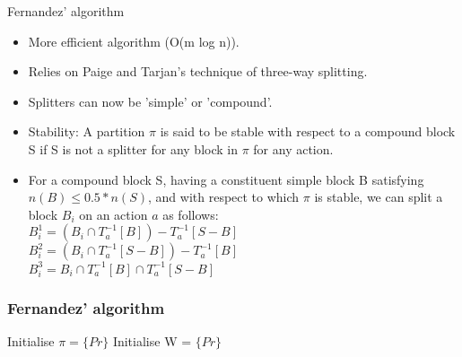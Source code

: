 \documentclass{beamer}
\begin{document}



\begin{frame}{Fernandez' algorithm}
  \begin{itemize}
  \item More efficient algorithm (O(m log n)).
  \item Relies on Paige and Tarjan's technique of three-way splitting.
  \item Splitters can now be 'simple' or 'compound'.
  \item Stability: A partition $\pi$ is said to be stable with respect to a
    compound block S if S is not a splitter for any block in $\pi$ for
    any action.
  \item For a compound block S, having a constituent simple block B
    satisfying $n(B) \le 0.5*n(S)$, and with respect to which $\pi$ is
    stable, we can split a block $B_i$ on an action $a$ as follows:\\
    $B_i^1 = (B_i \cap T_a^{-1}[B]) - T_a^{-1}[S-B]$ \\
    $B_i^2 = (B_i \cap T_a^{-1}[S-B]) - T_a^{-1}[B]$ \\
    $B_i^3 = B_i \cap T_a^{-1}[B] \cap T_a^{-1}[S-B]$ \\
  \end{itemize}
\end{frame}

\begin{frame}[fragile]

  \frametitle{Fernandez' algorithm}
  \begin{algorithm2e}[H]
    Initialise $\pi = \{Pr\}$\;
    Initialise W = $\{Pr\}$
  \end{algorithm2e}
\end{frame}
\end{document}
